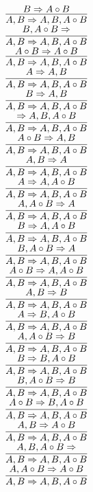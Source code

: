 \documentclass[11pt]{article}
\begin{document}
\begin{center}
\bigskip
\\$\infer{A, B\Rightarrow A, B, A\circ B}{B\Rightarrow A\circ B}$
\bigskip
\\$\infer{A, B\Rightarrow A, B, A\circ B}{B, A\circ B\Rightarrow }$
\bigskip
\\$\infer{A, B\Rightarrow A, B, A\circ B}{A\circ B\Rightarrow A\circ B}$
\bigskip
\\$\infer{A, B\Rightarrow A, B, A\circ B}{A\Rightarrow A, B}$
\bigskip
\\$\infer{A, B\Rightarrow A, B, A\circ B}{B\Rightarrow A, B}$
\bigskip
\\$\infer{A, B\Rightarrow A, B, A\circ B}{\Rightarrow A, B, A\circ B}$
\bigskip
\\$\infer{A, B\Rightarrow A, B, A\circ B}{A\circ B\Rightarrow A, B}$
\bigskip
\\$\infer{A, B\Rightarrow A, B, A\circ B}{A, B\Rightarrow A}$
\bigskip
\\$\infer{A, B\Rightarrow A, B, A\circ B}{A\Rightarrow A, A\circ B}$
\bigskip
\\$\infer{A, B\Rightarrow A, B, A\circ B}{A, A\circ B\Rightarrow A}$
\bigskip
\\$\infer{A, B\Rightarrow A, B, A\circ B}{B\Rightarrow A, A\circ B}$
\bigskip
\\$\infer{A, B\Rightarrow A, B, A\circ B}{B, A\circ B\Rightarrow A}$
\bigskip
\\$\infer{A, B\Rightarrow A, B, A\circ B}{A\circ B\Rightarrow A, A\circ B}$
\bigskip
\\$\infer{A, B\Rightarrow A, B, A\circ B}{A, B\Rightarrow B}$
\bigskip
\\$\infer{A, B\Rightarrow A, B, A\circ B}{A\Rightarrow B, A\circ B}$
\bigskip
\\$\infer{A, B\Rightarrow A, B, A\circ B}{A, A\circ B\Rightarrow B}$
\bigskip
\\$\infer{A, B\Rightarrow A, B, A\circ B}{B\Rightarrow B, A\circ B}$
\bigskip
\\$\infer{A, B\Rightarrow A, B, A\circ B}{B, A\circ B\Rightarrow B}$
\bigskip
\\$\infer{A, B\Rightarrow A, B, A\circ B}{A\circ B\Rightarrow B, A\circ B}$
\bigskip
\\$\infer{A, B\Rightarrow A, B, A\circ B}{A, B\Rightarrow A\circ B}$
\bigskip
\\$\infer{A, B\Rightarrow A, B, A\circ B}{A, B, A\circ B\Rightarrow }$
\bigskip
\\$\infer{A, B\Rightarrow A, B, A\circ B}{A, A\circ B\Rightarrow A\circ B}$
\bigskip

\end{center}
\end{document}
